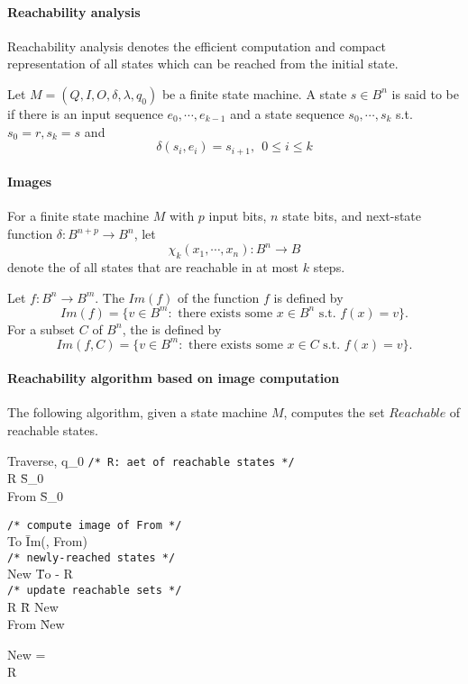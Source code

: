 \documentclass{memo}
\begin{document}
\paragraph{Reachability analysis} 
Reachability analysis denotes the efficient computation and compact
representation of all states which can be reached from the initial state.

Let $M = (Q, I, O, \delta, \lambda, q_0)$ be a finite state machine. A state
$s \in B^n$ is said to be  if there is an input sequence $e_0, \cdots, e_{k-1}$ and a state
sequence $s_0, \cdots, s_k$ s.t. $s_0 = r, s_k = s$ and
  \[ \delta(s_i, e_i) = s_{i+1}, \ \ 0 \le i \le k \]

\paragraph{Images}
For a finite state machine $M$ with $p$ input bits, $n$ state bits, and
next-state function $\delta: B^{n+p} \rightarrow B^n$, let
  \[ \chi_k(x_1, \cdots, x_n): B^n \rightarrow B\]
denote the  of all states that are reachable in at
most $k$ steps.

Let $f: B^n \rightarrow B^m$. The  $Im(f)$ of the function $f$ is
defined by
  \[ Im(f) = \{ v \in B^m: \mbox{\ there exists some\ } x \in B^n
  \mbox{\ s.t.\ } f(x) = v\}.\]
For a subset $C$ of $B^n$, the  is defined by
  \[ Im(f, C) = \{ v \in B^m: \mbox{\ there exists some\ } x \in C
  \mbox{\ s.t.\ } f(x) = v\}.\]

\paragraph{Reachability algorithm based on image computation}
The following algorithm, given a state machine $M$, computes the set $Reachable$
of reachable states. 

\vspace*{0.2cm}

\begin{algorithm}{Traverse}{\delta, q_0}
  \mbox{\tt{}/* R: aet of reachable states */}\\
  R \= S_0\\
  From \= S_0\\
  \begin{REPEAT}{}
    \mbox{\tt{}/* compute image of From */}\\
    To \= Im(\delta, From)\\
    \mbox{\tt{}/* newly-reached states */}\\
    New \= To - R\\
    \mbox{\tt{}/* update reachable sets */}\\
    R \= R \cup New\\
    From \= New
  \end{REPEAT} New = \emptyset\\
  \RETURN R
\end{algorithm}
\end{document}
